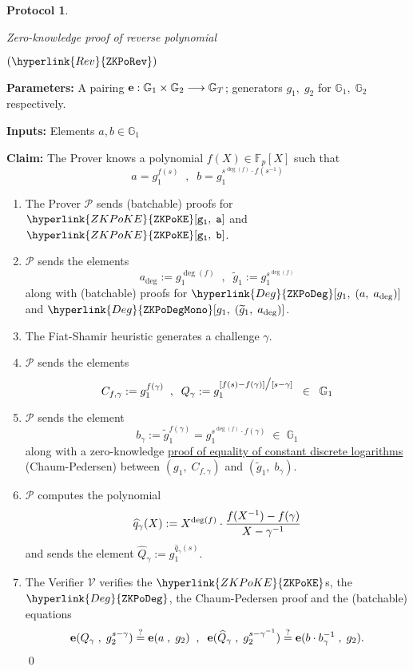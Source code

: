 \documentclass[11pt, lettersize, notitlepage, leqno, footskip=0.6cm]{article}
\newcommand{\bFp}{\mathbb{F}_p}
\newcommand{\lra}{\longrightarrow}
\newcommand{\wti}{\widetilde}
\newcommand{\mc}{\mathcal}
\newcommand{\mb}{\mathbb}
\newcommand{\mbf}{\mathbf}
\newcommand{\what}{\widehat}
\newcommand{\mP}{\mc{P}}
\newcommand{\V}{\mc{V}}
\newcommand{\vs}{\vspace{-0.15cm}}
\newcommand{\noin}{\noindent}
\newcommand{\sta}{\stackrel{?}{=}}
\newcommand{\e}{\mbf{e}}
\newtheorem{Prot}[Thm]{Protocol}
\numberwithin{equation}{section}
\begin{document}
\begin{mdframed}
\begin{Prot} \hypertarget{Con}{Zero-knowledge proof of reverse polynomial} $(\hyperlink{Rev}{\tt{ZKPoRev}})$\end{Prot}  

\noin \textbf{Parameters:} A pairing ${\bf{e}}:\mb{G}_1\times \mb{G}_2\lra \mb{G}_T$; generators $g_1,\;g_2$ for $\mb{G}_1,\; \mb{G}_2$ respectively.


\noindent \textbf{Inputs:} Elements $a, b \in \mb{G}_1$

\noin \textbf{Claim:} The Prover knows a polynomial $f(X)\in \bFp[X]$ such that \vs $$ a = g_1^{f(s)}\;\;,\;\;b = g_1^{s^{\deg(f)} \cdot f(s^{-1})}  $$

\begin{enumerate}[wide, labelwidth=!, labelindent=0pt, itemsep=-0.2ex]

\item The Prover $\mP$ sends (batchable) proofs for $\hyperlink{ZKPoKE}{\tt{ZKPoKE}}[g_1,\;a]$ and $\hyperlink{ZKPoKE}{\tt{ZKPoKE}}[g_1,\;b]$.

\item $\mP$ sends the elements $$a_{\deg}:= g_1^{\deg(f)}\;\;, \;\; \wti{g}_1:= g_1^{s^{\deg(f)}}  $$ along with (batchable) proofs for $\hyperlink{Deg}{\tt{ZKPoDeg}}[g_1,\;(a,\;a_{\deg})]$ and $\hyperlink{Deg}{\tt{ZKPoDegMono}}[g_1,\;(\wti{g}_1,\;a_{\deg})]$.

\item The Fiat-Shamir heuristic generates a challenge $\gamma$.

\item $\mP$ sends the elements \vspace{-3mm} $$C_{f,\gamma}:= g_1^{f(\gamma)}\;\;,\;\; Q_{\gamma}:= g_1^{[f(s)-f(\gamma)]\big/[s-\gamma]}\;\;\in\;\;\mb{G}_1 \vs $$

\item $\mP$ sends the element $$b_{\gamma}:= \wti{g}_1^{f(\gamma)} = g_1^{s^{\deg(f)}\cdot f(\gamma)}\;\in\;\mb{G}_1 $$ along with a zero-knowledge \hyperlink{CP}{proof of equality of constant discrete logarithms} (Chaum-Pedersen) between $(g_1,\; C_{f,\gamma})$ and $(\wti{g}_1,\; b_{\gamma})$.

\item $\mP$ computes the polynomial \vspace{-2mm} $$\what{q}_{\gamma}(X):= X^{\deg(f)}\cdot \frac{f(X^{-1}) - f(\gamma)}{X-\gamma^{-1}} \vs $$ and sends the element $\what{Q}_{\gamma}:= g_1^{\what{q}_{\gamma}(s)}$. 

\item The Verifier $\V$ verifies the $\hyperlink{ZKPoKE}{\tt{ZKPoKE}}$s, the $\hyperlink{Deg}{\tt{ZKPoDeg}}$, the Chaum-Pedersen proof and the (batchable) equations \vs $$ \e(Q_{\gamma}\;,\;g_2^{s-\gamma})\sta \e(a\;,\;g_2)  \;\;,\;\;\e(\what{Q}_{\gamma}\;,\;g_2^{s-\gamma^{-1}})\sta \e(b\cdot b_{\gamma}^{-1}\;,\;g_2).\vs  $$ \qed \end{enumerate} \end{mdframed}
\end{document}
